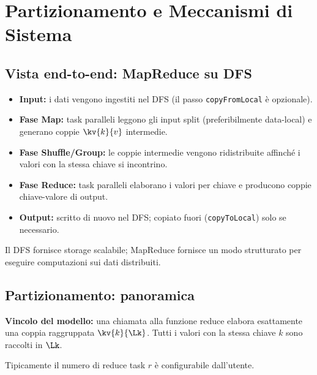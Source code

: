 \newpage
\section{Partizionamento e Meccanismi di Sistema}

\subsection{Vista end-to-end: MapReduce su DFS}

\begin{itemize}
  \item \textbf{Input:} i dati vengono ingestiti nel DFS (il passo
    \texttt{copyFromLocal} è opzionale).
  \item \textbf{Fase Map:} task paralleli leggono gli input split
    (preferibilmente data-local) e generano coppie $\kv{k}{v}$ intermedie.
  \item \textbf{Fase Shuffle/Group:} le coppie intermedie vengono ridistribuite
    affinché i valori con la stessa chiave si incontrino.
  \item \textbf{Fase Reduce:} task paralleli elaborano i valori per chiave
    e producono coppie chiave-valore di output.
  \item \textbf{Output:} scritto di nuovo nel DFS; copiato fuori
    (\texttt{copyToLocal}) solo se necessario.
\end{itemize}

\begin{takeaway}
  Il DFS fornisce storage scalabile; MapReduce fornisce un modo strutturato
  per eseguire computazioni sui dati distribuiti.
\end{takeaway}

\subsection{Partizionamento: panoramica}

\begin{importante}
  \textbf{Vincolo del modello:} una chiamata alla funzione reduce elabora
  esattamente una coppia raggruppata $\kv{k}{\Lk}$. Tutti i valori con la
  stessa chiave $k$ sono raccolti in $\Lk$.
\end{importante}

Tipicamente il numero di reduce task $r$ è configurabile dall'utente.

